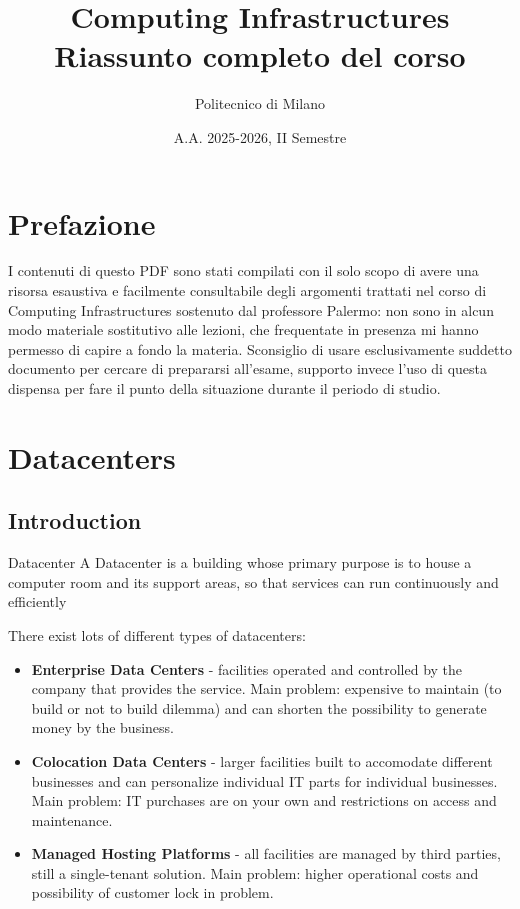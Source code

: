 \documentclass[11pt,a4paper]{article}
\title{\textbf{Computing Infrastructures}\\
\large Riassunto completo del corso}
\author{Politecnico di Milano}
\date{A.A. 2025-2026, II Semestre}
\begin{document}
\maketitle
\tableofcontents
\newpage

\section{Prefazione}
I contenuti di questo PDF sono stati compilati con il solo scopo di avere una risorsa esaustiva e facilmente consultabile degli argomenti trattati nel corso di Computing Infrastructures sostenuto dal professore Palermo: non sono in alcun modo materiale sostitutivo alle lezioni, che frequentate in presenza mi hanno permesso di capire a fondo la materia. Sconsiglio di usare esclusivamente suddetto documento per cercare di prepararsi all'esame, supporto invece l'uso di questa dispensa per fare il punto della situazione durante il periodo di studio.

\section{Datacenters}
\subsection{Introduction}
\begin{key}{Datacenter}
A Datacenter is a building whose primary purpose is to house a computer room and its support areas, so that services can run continuously and efficiently
\end{key}
There exist lots of different types of datacenters:
\begin{itemize}
\item \textbf{Enterprise Data Centers} - facilities operated and controlled by the company that provides the service. Main problem: expensive to maintain (to build or not to build dilemma) and can shorten the possibility to generate money by the business.
\item \textbf{Colocation Data Centers} - larger facilities built to accomodate different businesses and can personalize individual IT parts for individual businesses. Main problem: IT purchases are on your own and restrictions on access and maintenance. 
\item \textbf{Managed Hosting Platforms} - all facilities are managed by third parties, still a single-tenant solution. Main problem: higher operational costs and possibility of customer lock in problem.
\end{itemize}
\end{document}
